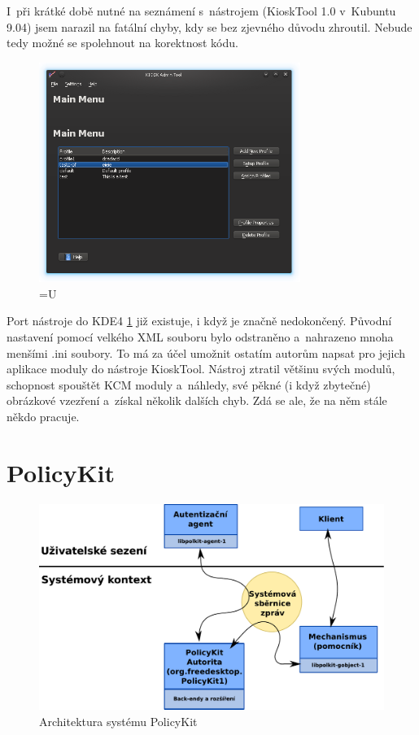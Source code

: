 I~při krátké době nutné na seznámení s~nástrojem (KioskTool 1.0 v~Kubuntu 9.04)
jsem narazil na fatální chyby, kdy se bez zjevného důvodu zhroutil. Nebude tedy
možné se spolehnout na korektnost kódu.

\begin{figure}[h]
    \centering
    \includegraphics[width=8.5cm]{obrazky/KioskToolKDE4/kiosktool_kde4.png}
    \caption{=U}
    \label{fig:kt4_uvod}
\end{figure}

Port nástroje do KDE4 \ref{fig:kt4_uvod} již existuje, i když je značně
nedokončený.  %
Původní nastavení pomocí velkého XML souboru bylo odstraněno a~nahrazeno mnoha
menšími .ini soubory. To má za účel umožnit ostatím autorům napsat pro jejich
aplikace moduly do nástroje KioskTool. Nástroj ztratil většinu svých modulů,
schopnost spouštět KCM moduly a~náhledy, své pěkné (i když zbytečné) obrázkové
vzezření a~získal několik dalších chyb. Zdá se ale, že na něm stále někdo
pracuje. %

\section{PolicyKit}
\begin{figure}[h]
    \centering
    \includegraphics[width=12cm]{obrazky/polkit-architecture-vector-cz.pdf}
    \caption{Architektura systému PolicyKit}
    \label{fig:polkit_arch}
\end{figure}

